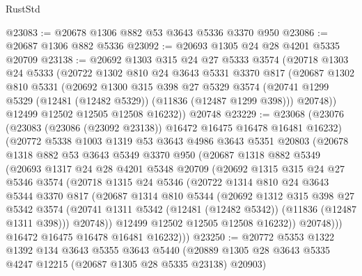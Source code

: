 \begin{lexlean}{RustStd}
\begin{coremodule}
@23083 := @20678 @1306 @882 @53 @3643 @5336 @3370 @950
@23086 := @20687 @1306 @882 @5336
@23092 := @20693 @1305 @24 @28 @4201 @5335 @20709
@23138 := @20692
    @1303
    @315
    @24
    @27
    @5333
    @3574
    (@20718
      @1303
      @24
      @5333
      (@20722
        @1302
        @810
        @24
        @3643
        @5331
        @3370
        @817
        (@20687
          @1302
          @810
          @5331
          (@20692
            @1300
            @315
            @398
            @27
            @5329
            @3574
            (@20741 @1299 @5329 (@12481 (@12482 @5329)) (@11836 (@12487 @1299 @398)))
            @20748))
        @12499
        @12502
        @12505
        @12508
        @16232))
    @20748
@23229 := @23068
    (@23076
      (@23083 (@23086 (@23092 @23138)) @16472 @16475 @16478 @16481 @16232)
      (@20772
        @5338
        @1003
        @1319
        @53
        @3643
        @4986
        @3643
        @5351
        @20803
        (@20678
          @1318
          @882
          @53
          @3643
          @5349
          @3370
          @950
          (@20687
            @1318
            @882
            @5349
            (@20693
              @1317
              @24
              @28
              @4201
              @5348
              @20709
              (@20692
                @1315
                @315
                @24
                @27
                @5346
                @3574
                (@20718
                  @1315
                  @24
                  @5346
                  (@20722
                    @1314
                    @810
                    @24
                    @3643
                    @5344
                    @3370
                    @817
                    (@20687
                      @1314
                      @810
                      @5344
                      (@20692
                        @1312
                        @315
                        @398
                        @27
                        @5342
                        @3574
                        (@20741 @1311 @5342 (@12481 (@12482 @5342)) (@11836 (@12487 @1311 @398)))
                        @20748))
                    @12499
                    @12502
                    @12505
                    @12508
                    @16232))
                @20748)))
          @16472
          @16475
          @16478
          @16481
          @16232)))
@23250 := @20772
    @5353
    @1322
    @1392
    @134
    @3643
    @5355
    @3643
    @5440
    (@20889 @1305 @28 @3643 @5335 @4247 @12215 (@20687 @1305 @28 @5335 @23138) @20903)

\end{coremodule}
\end{lexlean}
